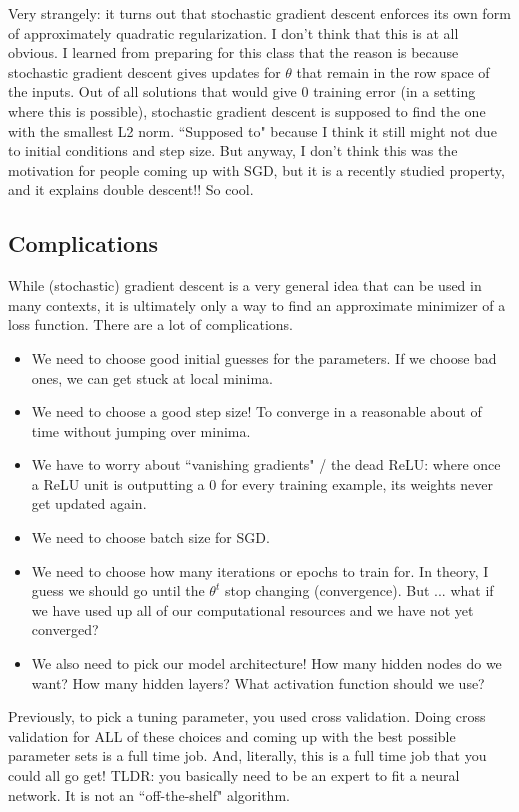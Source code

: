 Very strangely: it turns out that stochastic gradient descent enforces its own form of approximately quadratic regularization. I don't think that this is at all obvious. I learned from preparing for this class that the reason is because stochastic gradient descent gives updates for $\theta$ that remain in the row space of the inputs. Out of all solutions that would give $0$ training error (in a setting where this is possible), stochastic gradient descent is supposed to find the one with the smallest L2 norm. ``Supposed to" because I think it still might not due to initial conditions and step size. But anyway, I don't think this was the motivation for people coming up with SGD, but it is a recently studied property, and it explains double descent!! So cool. 





\subsection{Complications}

While (stochastic) gradient descent is a very general idea that can be used in many contexts, it is ultimately only a way to find an approximate minimizer of a loss function. There are a lot of complications.
\begin{itemize}
\item We need to choose good initial guesses for the parameters. If we choose bad ones, we can get stuck at local minima.
\item We need to choose a good step size! To converge in a reasonable about of time without jumping over minima. 
\item We have to worry about ``vanishing gradients" / the dead ReLU: where once a ReLU unit is outputting a 0 for every training example, its weights never get updated again. 
\item We need to choose batch size for SGD.
\item We need to choose how many iterations or epochs to train for. In theory, I guess we should go until the $\theta^t$ stop changing (convergence). But ... what if we have used up all of our computational resources and we have not yet converged? 
\item We also need to pick our model architecture! How many hidden nodes do we want? How many hidden layers? What activation function should we use? 
\end{itemize}

Previously, to pick a tuning parameter, you used cross validation. Doing cross validation for ALL of these choices and coming up with the best possible parameter sets is a full time job. And, literally, this is a full time job that you could all go get! TLDR: you basically need to be an expert to fit a neural network. It is not an ``off-the-shelf" algorithm. 


